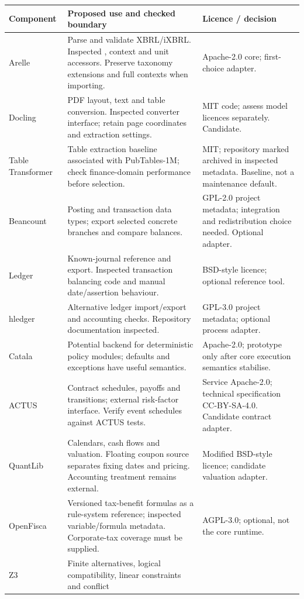 \begin{longtable}{L{26mm}L{71mm}L{39mm}}
\toprule Component & Proposed use and checked boundary & Licence / decision\\\midrule\endhead
Arelle & Parse and validate XBRL/iXBRL. Inspected , context and
unit accessors. Preserve taxonomy extensions and full contexts when importing.
& Apache-2.0 core; first-choice adapter.\\
Docling & PDF layout, text and table conversion. Inspected converter interface;
retain page coordinates and extraction settings. & MIT code; assess model
licences separately. Candidate.\\
Table Transformer & Table extraction baseline associated with PubTables-1M;
check finance-domain performance before selection. & MIT; repository marked
archived in inspected metadata. Baseline, not a maintenance default.\\
Beancount & Posting and transaction data types; export selected concrete
branches and compare balances. & GPL-2.0 project metadata; integration and
redistribution choice needed. Optional adapter.\\
Ledger & Known-journal reference and export. Inspected transaction balancing
code and manual date/assertion behaviour. & BSD-style licence; optional
reference tool.\\
hledger & Alternative ledger import/export and accounting checks. Repository
documentation inspected. & GPL-3.0 project metadata; optional process adapter.\\
Catala & Potential backend for deterministic policy modules; defaults and
exceptions have useful semantics. & Apache-2.0; prototype only after core
execution semantics stabilise.\\
ACTUS & Contract schedules, payoffs and transitions; external risk-factor
interface. Verify event schedules against ACTUS tests. & Service Apache-2.0;
technical specification CC-BY-SA-4.0. Candidate contract adapter.\\
QuantLib & Calendars, cash flows and valuation. Floating coupon source separates
fixing dates and pricing. Accounting treatment remains external. & Modified
BSD-style licence; candidate valuation adapter.\\
OpenFisca & Versioned tax-benefit formulas as a rule-system reference; inspected
variable/formula metadata. Corporate-tax coverage must be supplied. & AGPL-3.0;
optional, not the core runtime.\\
Z3 & Finite alternatives, logical compatibility, linear constraints and conflict

\end{longtable}
